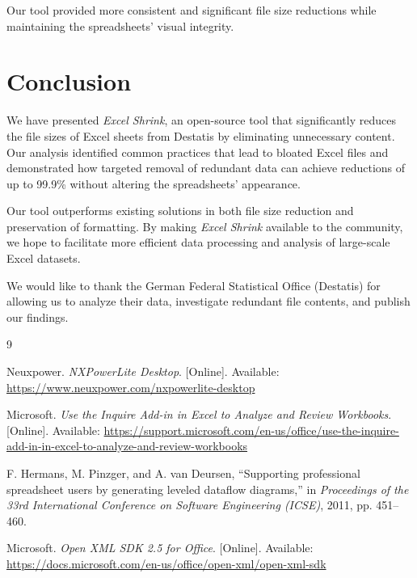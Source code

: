 \documentclass[sigconf]{acmart}
\begin{document}
Our tool provided more consistent and significant file size reductions while maintaining the spreadsheets' visual integrity.

\section{Conclusion}
\label{sec:conclusion}

We have presented \textit{Excel Shrink}, an open-source tool that significantly reduces the file sizes of Excel sheets from Destatis by eliminating unnecessary content. Our analysis identified common practices that lead to bloated Excel files and demonstrated how targeted removal of redundant data can achieve reductions of up to 99.9\% without altering the spreadsheets' appearance.

Our tool outperforms existing solutions in both file size reduction and preservation of formatting. By making \textit{Excel Shrink} available to the community, we hope to facilitate more efficient data processing and analysis of large-scale Excel datasets.

\begin{acks} We would like to thank the German Federal Statistical Office (Destatis) for allowing us to analyze their data, investigate redundant file contents, and publish our findings. \end{acks}


\begin{thebibliography}{9}

Neuxpower. \emph{NXPowerLite Desktop}. [Online]. Available: \url{https://www.neuxpower.com/nxpowerlite-desktop}

Microsoft. \emph{Use the Inquire Add-in in Excel to Analyze and Review Workbooks}. [Online]. Available: \url{https://support.microsoft.com/en-us/office/use-the-inquire-add-in-in-excel-to-analyze-and-review-workbooks}

F. Hermans, M. Pinzger, and A. van Deursen, ``Supporting professional spreadsheet users by generating leveled dataflow diagrams,'' in \emph{Proceedings of the 33rd International Conference on Software Engineering (ICSE)}, 2011, pp. 451--460.

Microsoft. \emph{Open XML SDK 2.5 for Office}. [Online]. Available: \url{https://docs.microsoft.com/en-us/office/open-xml/open-xml-sdk}

\end{thebibliography}
\end{document}

